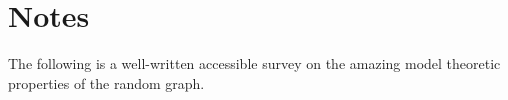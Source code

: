 \documentclass[creche.tex]{subfiles}
\begin{document}
\section{Notes}

The following is a well-written accessible survey on the amazing model theoretic properties of the random graph.


\begin{biblist}[]\normalsize

   

\end{biblist}
\end{document}
